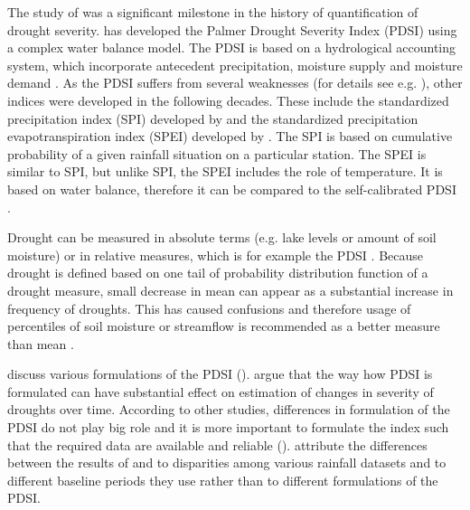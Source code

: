 \documentclass[a4paper,12pt]{article}
\begin{document}
The study of \cite{palmer1965} was a significant milestone in the history of quantification of drought severity. \cite{palmer1965} has developed the Palmer Drought Severity Index (PDSI) using a complex water balance model. The PDSI is based on a hydrological accounting system, which incorporate antecedent precipitation, moisture supply and moisture demand \citep{Heim2002}. As the PDSI suffers from several weaknesses (for details see e.g. \citealt{Heim2002}), other indices were developed in the following decades. These include the standardized precipitation index (SPI) developed by \cite{SPI} and the standardized precipitation evapotranspiration index (SPEI) developed by \cite{SPEI}. The SPI is based on cumulative probability of a given rainfall situation on a particular station. The SPEI is similar to SPI, but unlike SPI, the SPEI includes the role of temperature. It is based on water balance, therefore it can be compared to the self-calibrated PDSI \citep{SPEI}. 


Drought can be measured in absolute terms (e.g. lake levels or amount of soil moisture) or in relative measures, which is for example the  PDSI \citep{Trenberth2014}. Because drought is defined based on one tail of probability distribution function of a drought measure, small decrease in mean can appear as a substantial increase in frequency of droughts. This has caused confusions and therefore usage of percentiles of soil moisture or streamflow is recommended as a better measure than mean \citep{Trenberth2014}.





\cite{Trenberth2014} discuss various formulations of the PDSI (\citealt{Sheffield2012, Dai2011}).  \cite{Sheffield2012} argue that the way  how PDSI is formulated can have substantial effect on estimation of changes in severity of droughts over time. According to other studies, differences in formulation of the PDSI do not play big role and it is more important to formulate the index such that the required data are available and reliable (\citealp{Trenberth2014,vanderSchrier2011,Wang2012}). \cite{Trenberth2014} attribute the differences between the results of \cite{Sheffield2012} and \cite{Trenberth2014} to disparities among various rainfall datasets and to different baseline periods they use rather than to different formulations of the PDSI.   
\end{document}
